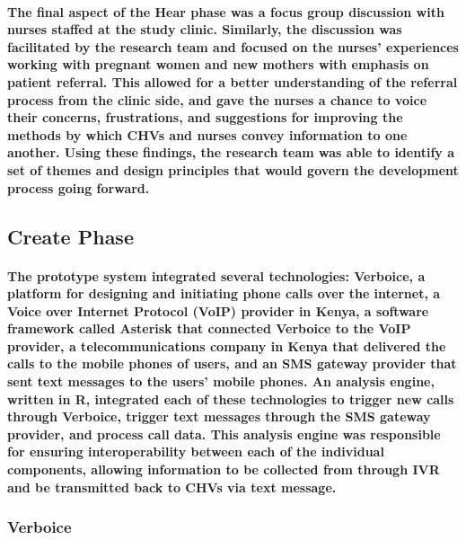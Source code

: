 \paragraph{The final aspect of the Hear phase was a focus group discussion with nurses staffed at the study clinic. Similarly, the discussion was facilitated by the research team and focused on the nurses' experiences working with pregnant women and new mothers with emphasis on patient referral. This allowed for a better understanding of the referral process from the clinic side, and gave the nurses a chance to voice their concerns, frustrations, and suggestions for improving the methods by which CHVs and nurses convey information to one another. Using these findings, the research team was able to identify a set of themes and design principles that would govern the development process going forward.}


\subsection{Create Phase}

\paragraph{The prototype system integrated several technologies: Verboice, a platform for designing and initiating phone calls over the internet, a Voice over Internet Protocol (VoIP) provider in Kenya, a software framework called Asterisk that connected Verboice to the VoIP provider, a telecommunications company in Kenya that delivered the calls to the mobile phones of users, and an SMS gateway provider that sent text messages to the users' mobile phones. An analysis engine, written in R, integrated each of these technologies to trigger new calls through Verboice, trigger text messages through the SMS gateway provider, and process call data. This analysis engine was responsible for ensuring interoperability between each of the individual components, allowing information to be collected from through IVR and be transmitted back to CHVs via text message.}

\subsubsection{Verboice}
